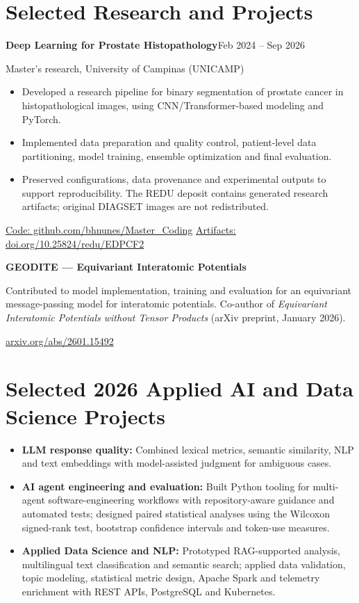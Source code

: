 \documentclass[10pt,a4paper]{article}
\begin{document}
\newpage
\section{Selected Research and Projects}
\textbf{Deep Learning for Prostate Histopathology}\hfill {\small Feb 2024 -- Sep 2026}\par
Master's research, University of Campinas (UNICAMP)\par
\begin{itemize}
  \item Developed a research pipeline for binary segmentation of prostate cancer in histopathological images, using CNN/Transformer-based modeling and PyTorch.
  \item Implemented data preparation and quality control, patient-level data partitioning, model training, ensemble optimization and final evaluation.
  \item Preserved configurations, data provenance and experimental outputs to support reproducibility. The REDU deposit contains generated research artifacts; original DIAGSET images are not redistributed.
\end{itemize}
{\small \href{https://github.com/bhnunes/Master_Coding}{Code: github.com/bhnunes/Master\_Coding}\quad\textbar\quad
\href{https://doi.org/10.25824/redu/EDPCF2}{Artifacts: doi.org/10.25824/redu/EDPCF2}}\par
\vspace{2pt}
\textbf{GEODITE --- Equivariant Interatomic Potentials}\par
Contributed to model implementation, training and evaluation for an equivariant message-passing model for interatomic potentials. Co-author of \emph{Equivariant Interatomic Potentials without Tensor Products} (arXiv preprint, January 2026).\par
{\small \href{https://arxiv.org/abs/2601.15492}{arxiv.org/abs/2601.15492}}\par

\section{Selected 2026 Applied AI and Data Science Projects}
\begin{itemize}
  \item \textbf{LLM response quality:} Combined lexical metrics, semantic similarity, NLP and text embeddings with model-assisted judgment for ambiguous cases.
  \item \textbf{AI agent engineering and evaluation:} Built Python tooling for multi-agent software-engineering workflows with repository-aware guidance and automated tests; designed paired statistical analyses using the Wilcoxon signed-rank test, bootstrap confidence intervals and token-use measures.
  \item \textbf{Applied Data Science and NLP:} Prototyped RAG-supported analysis, multilingual text classification and semantic search; applied data validation, topic modeling, statistical metric design, Apache Spark and telemetry enrichment with REST APIs, PostgreSQL and Kubernetes.
\end{itemize}
\end{document}
